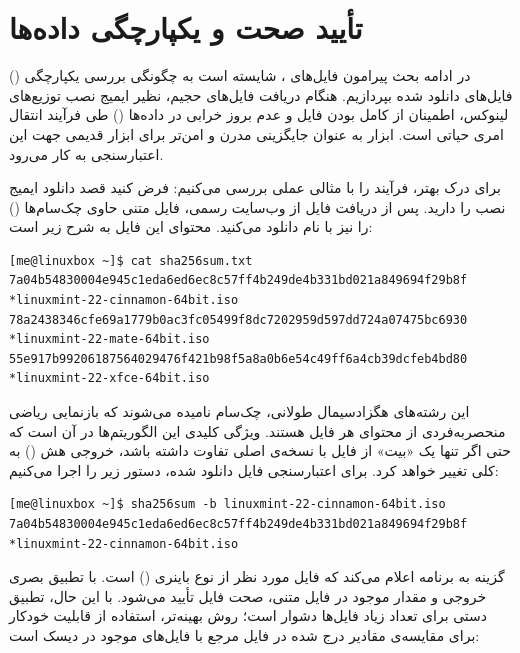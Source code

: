 \section{تأیید صحت و یکپارچگی داده‌ها}

در ادامه بحث پیرامون فایل‌های ، شایسته است به چگونگی بررسی یکپارچگی () فایل‌های دانلود شده بپردازیم. هنگام دریافت فایل‌های حجیم، نظیر ایمیج نصب توزیع‌های لینوکس، اطمینان از کامل بودن فایل و عدم بروز خرابی در داده‌ها () طی فرآیند انتقال امری حیاتی است. ابزار  به عنوان جایگزینی مدرن و امن‌تر برای ابزار قدیمی  جهت این اعتبارسنجی به کار می‌رود.

برای درک بهتر، فرآیند را با مثالی عملی بررسی می‌کنیم: فرض کنید قصد دانلود ایمیج نصب  را دارید. پس از دریافت فایل  از وب‌سایت رسمی، فایل متنی حاوی چک‌سام‌ها () را نیز با نام  دانلود می‌کنید. محتوای این فایل به شرح زیر است:

\begin{latin}
\begin{lstlisting}
[me@linuxbox ~]$ cat sha256sum.txt
7a04b54830004e945c1eda6ed6ec8c57ff4b249de4b331bd021a849694f29b8f *linuxmint-22-cinnamon-64bit.iso
78a2438346cfe69a1779b0ac3fc05499f8dc7202959d597dd724a07475bc6930 *linuxmint-22-mate-64bit.iso
55e917b99206187564029476f421b98f5a8a0b6e54c49ff6a4cb39dcfeb4bd80 *linuxmint-22-xfce-64bit.iso
\end{lstlisting}
\end{latin}

این رشته‌های هگزادسیمال طولانی، چک‌سام نامیده می‌شوند که بازنمایی ریاضی منحصربه‌فردی از محتوای هر فایل هستند. ویژگی کلیدی این الگوریتم‌ها در آن است که حتی اگر تنها یک «بیت» از فایل  با نسخه‌ی اصلی تفاوت داشته باشد، خروجی هش () به کلی تغییر خواهد کرد. برای اعتبارسنجی فایل دانلود شده، دستور زیر را اجرا می‌کنیم:

\begin{latin}
\begin{lstlisting}
[me@linuxbox ~]$ sha256sum -b linuxmint-22-cinnamon-64bit.iso
7a04b54830004e945c1eda6ed6ec8c57ff4b249de4b331bd021a849694f29b8f *linuxmint-22-cinnamon-64bit.iso
\end{lstlisting}
\end{latin}

گزینه  به برنامه اعلام می‌کند که فایل مورد نظر از نوع باینری () است. با تطبیق بصری خروجی و مقدار موجود در فایل متنی، صحت فایل تأیید می‌شود. با این حال، تطبیق دستی برای تعداد زیاد فایل‌ها دشوار است؛ روش بهینه‌تر، استفاده از قابلیت خودکار  برای مقایسه‌ی مقادیر درج شده در فایل مرجع با فایل‌های موجود در دیسک است:


